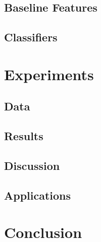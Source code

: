 \documentclass[runningheads]{llncs}
\begin{document}
\subsection{Baseline Features}
\subsection{Classifiers}
\section{Experiments}
\subsection{Data}
\subsection{Results}
\subsection{Discussion}
\subsection{Applications}
\section{Conclusion}



\end{document}
